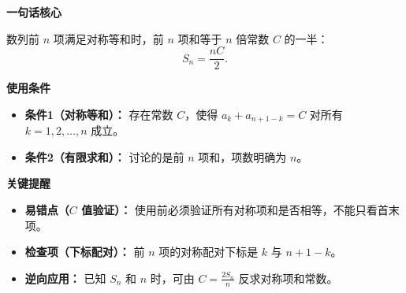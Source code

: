 \begin{summarybox}
	\textbf{\textcolor{CSummary}{一句话核心}}

	数列前 \(n\) 项满足对称等和时，前 \(n\) 项和等于 \(n\) 倍常数 \(C\) 的一半：
	\[
		S_n=\frac{nC}{2}.
	\]

	\medskip
	\textbf{\textcolor{CSummary}{使用条件}}
	\begin{itemize}[leftmargin=*, itemsep=0.5em, topsep=0.4em]
		\item \textbf{条件1（对称等和）：} 存在常数 \(C\)，使得 \(a_k+a_{n+1-k}=C\) 对所有 \(k=1,2,\dots,n\) 成立。
		\item \textbf{条件2（有限求和）：} 讨论的是前 \(n\) 项和，项数明确为 \(n\)。
	\end{itemize}

	\medskip
	\textbf{\textcolor{CSummary}{关键提醒}}
	\begin{itemize}[leftmargin=*, itemsep=0.5em, topsep=0.4em]
		\item \textbf{易错点（\(C\) 值验证）：} 使用前必须验证所有对称项和是否相等，不能只看首末项。
		\item \textbf{检查项（下标配对）：} 前 \(n\) 项的对称配对下标是 \(k\) 与 \(n+1-k\)。
		\item \textbf{逆向应用：} 已知 \(S_n\) 和 \(n\) 时，可由 \(C=\frac{2S_n}{n}\) 反求对称项和常数。
	\end{itemize}
\end{summarybox}